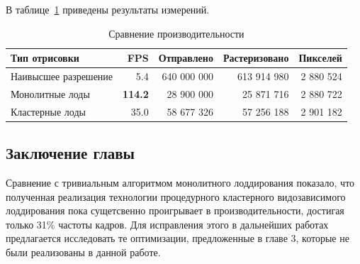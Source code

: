 В таблице~\ref{tab:cmp} приведены результаты измерений.

\begin{table}[h]
    \centering
    \begin{tabular}{lrrrr}
        \hline \hline
        Тип отрисовки
        & FPS
        & Отправлено
        & Растеризовано
        & Пикселей \\ \hline
        Наивысшее разрешение
        & 5.4
        & 640 000 000
        & 613 914 980
        & 2 880 524 \\
        Монолитные лоды
        & \textbf{114.2}
        & 28 900 000
        & 25 871 716
        & 2 880 722 \\
        Кластерные лоды
        & 35.0
        & 58 677 326
        & 57 256 188
        & 2 901 182 \\
        \hline \hline
    \end{tabular}

    \caption{Сравнение производительности}
    \label{tab:cmp}
\end{table}




\subsection*{Заключение главы}
Сравнение с тривиальным алгоритмом монолитного лоддирования показало, что полученная реализация технологии процедурного кластерного видозависимого лоддирования пока сущетсвенно проигрывает в производительности, достигая только 31\% частоты кадров.
Для исправления этого в дальнейших работах предлагается исследовать те оптимизации, предложенные в главе 3, которые не были реализованы в данной работе.
